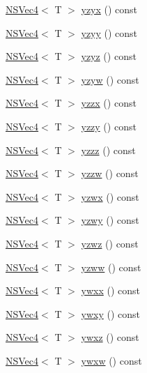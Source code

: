 \begin{DoxyCompactItemize}
\item 
\hyperlink{structNSVec4}{N\-S\-Vec4}$<$ T $>$ \hyperlink{structNSVec4_a5c13e0637e0ea3084c63dd28a39b8b4c}{yzyx} () const 
\item 
\hyperlink{structNSVec4}{N\-S\-Vec4}$<$ T $>$ \hyperlink{structNSVec4_addf3d7db35f9c558deacad495a7086d4}{yzyy} () const 
\item 
\hyperlink{structNSVec4}{N\-S\-Vec4}$<$ T $>$ \hyperlink{structNSVec4_a892c29354f648100288320945f1f12e3}{yzyz} () const 
\item 
\hyperlink{structNSVec4}{N\-S\-Vec4}$<$ T $>$ \hyperlink{structNSVec4_a37626fc1e042da019bae6f33ad0894e8}{yzyw} () const 
\item 
\hyperlink{structNSVec4}{N\-S\-Vec4}$<$ T $>$ \hyperlink{structNSVec4_a1c8c8e2391cab11b0c875cae3491f8e2}{yzzx} () const 
\item 
\hyperlink{structNSVec4}{N\-S\-Vec4}$<$ T $>$ \hyperlink{structNSVec4_a625c780de953f21d078638010338c7b4}{yzzy} () const 
\item 
\hyperlink{structNSVec4}{N\-S\-Vec4}$<$ T $>$ \hyperlink{structNSVec4_aa4381badc8d4822e1025e45008a3e336}{yzzz} () const 
\item 
\hyperlink{structNSVec4}{N\-S\-Vec4}$<$ T $>$ \hyperlink{structNSVec4_aaf67a22ddfb7c62951e858246cc26d4b}{yzzw} () const 
\item 
\hyperlink{structNSVec4}{N\-S\-Vec4}$<$ T $>$ \hyperlink{structNSVec4_af74557d31788c285acd580d00aa642df}{yzwx} () const 
\item 
\hyperlink{structNSVec4}{N\-S\-Vec4}$<$ T $>$ \hyperlink{structNSVec4_a19db8491322f85440d186a67fd54f79c}{yzwy} () const 
\item 
\hyperlink{structNSVec4}{N\-S\-Vec4}$<$ T $>$ \hyperlink{structNSVec4_a7108f6c6316615d6205f52cdcddcd28e}{yzwz} () const 
\item 
\hyperlink{structNSVec4}{N\-S\-Vec4}$<$ T $>$ \hyperlink{structNSVec4_ae9c9a31a8aec025f9b69223bf99d6179}{yzww} () const 
\item 
\hyperlink{structNSVec4}{N\-S\-Vec4}$<$ T $>$ \hyperlink{structNSVec4_a68ff917b2349447b2478bfb1bcb7f153}{ywxx} () const 
\item 
\hyperlink{structNSVec4}{N\-S\-Vec4}$<$ T $>$ \hyperlink{structNSVec4_a2ae27b2a1aadbafb8da7bb0123dd7d6d}{ywxy} () const 
\item 
\hyperlink{structNSVec4}{N\-S\-Vec4}$<$ T $>$ \hyperlink{structNSVec4_a448cfba15ce02b46defed89e52286e84}{ywxz} () const 
\item 
\hyperlink{structNSVec4}{N\-S\-Vec4}$<$ T $>$ \hyperlink{structNSVec4_a0faeccbf9472a954efb1dd1100c656cf}{ywxw} () const 

\end{DoxyCompactItemize}

